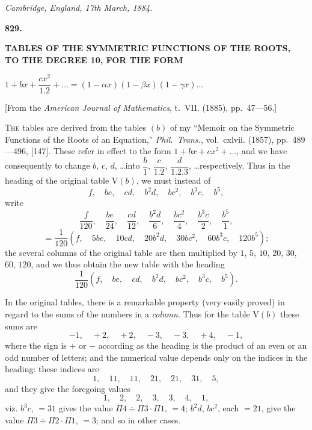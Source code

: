 \documentclass[11pt,a4paper]{book}
\begin{document}
\begin{flushright}
\textit{Cambridge, England, 17th March, 1884.}
\end{flushright}

\newpage
\setcounter{page}{263}


\begin{center}
\Large\textbf{829.}

\bigskip

\Large\textbf{TABLES OF THE SYMMETRIC FUNCTIONS OF THE ROOTS,}\\[0.3em]
\Large\textbf{TO THE DEGREE 10, FOR THE FORM}

\bigskip

\Large$1 + bx + \dfrac{cx^2}{1.2} + \dots = (1 - \alpha x)(1 - \beta x)(1 - \gamma x)\dots$
\end{center}

\begin{center}
[From the \textit{American Journal of Mathematics}, t.~VII. (1885), pp.~47---56.]
\end{center}

\noindent\textsc{The} tables are derived from the tables $(b)$ of my ``Memoir on the Symmetric Functions of the Roots of an Equation,'' \textit{Phil.~Trans.}, vol.~cxlvii. (1857), pp.~489---496, [147]. These refer in effect to the form $1 + bx + cx^2 + \dots$, and we have consequently to change $b$, $c$, $d$, \dots into $\dfrac{b}{1}$, $\dfrac{c}{1.2}$, $\dfrac{d}{1.2.3}$, \dots respectively. Thus in the heading of the original table V$(b)$, we must instead of
\[
f,\quad be,\quad cd,\quad b^2d,\quad bc^2,\quad b^3c,\quad b^5,
\]
write
\[
\frac{f}{120},\quad \frac{be}{24},\quad \frac{cd}{12},\quad \frac{b^2d}{6},\quad \frac{bc^2}{4},\quad \frac{b^3c}{2},\quad \frac{b^5}{1},
\]
\[
= \frac{1}{120}(f,\quad 5be,\quad 10cd,\quad 20b^2d,\quad 30bc^2,\quad 60b^3c,\quad 120b^5);
\]
the several columns of the original table are then multiplied by $1$, $5$, $10$, $20$, $30$, $60$, $120$, and we thus obtain the new table with the heading
\[
\frac{1}{120}(f,\quad be,\quad cd,\quad b^2d,\quad bc^2,\quad b^3c,\quad b^5).
\]

In the original tables, there is a remarkable property (very easily proved) in regard to the sums of the numbers in a \textit{column}. Thus for the table V$(b)$ these sums are
\[
-1,\quad +2,\quad +2,\quad -3,\quad -3,\quad +4,\quad -1,
\]
where the sign is $+$ or $-$ according as the heading is the product of an even or an odd number of letters; and the numerical value depends only on the indices in the heading: these indices are
\[
1,\quad 11,\quad 11,\quad 21,\quad 21,\quad 31,\quad 5,
\]
and they give the foregoing values
\[
1,\quad 2,\quad 2,\quad 3,\quad 3,\quad 4,\quad 1,
\]
viz. $b^3c$, $= 31$ gives the value $\Pi 4 \div \Pi 3 \cdot \Pi 1$, $= 4$; $b^2d$, $bc^2$, each $= 21$, give the value $\Pi 3 \div \Pi 2 \cdot \Pi 1$, $= 3$; and so in other cases.
\end{document}
